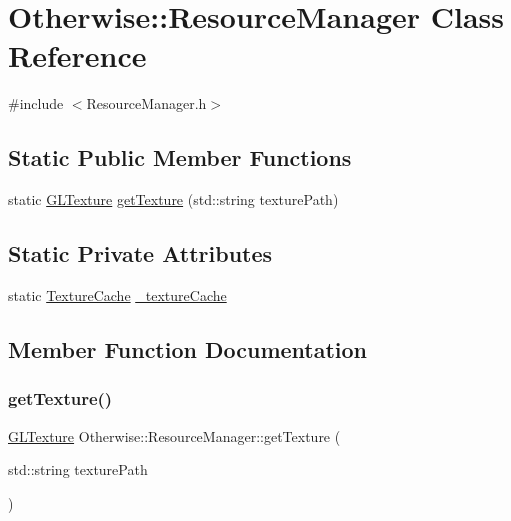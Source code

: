 \hypertarget{class_otherwise_1_1_resource_manager}{}\section{Otherwise\+:\+:Resource\+Manager Class Reference}
\label{class_otherwise_1_1_resource_manager}


{\ttfamily \#include $<$Resource\+Manager.\+h$>$}

\subsection*{Static Public Member Functions}
\begin{DoxyCompactItemize}
\item 
static \hyperlink{struct_otherwise_1_1_g_l_texture}{G\+L\+Texture} \hyperlink{class_otherwise_1_1_resource_manager_a4aaa0b8c06f76643576c5d43338dbe84}{get\+Texture} (std\+::string texture\+Path)
\end{DoxyCompactItemize}
\subsection*{Static Private Attributes}
\begin{DoxyCompactItemize}
\item 
static \hyperlink{class_otherwise_1_1_texture_cache}{Texture\+Cache} \hyperlink{class_otherwise_1_1_resource_manager_a7fb7f4f144620d1e26228662b30530f4}{\+\_\+texture\+Cache}
\end{DoxyCompactItemize}


\subsection{Member Function Documentation}
\mbox{\label{class_otherwise_1_1_resource_manager_a4aaa0b8c06f76643576c5d43338dbe84}} 
\subsubsection{\texorpdfstring{get\+Texture()}{getTexture()}}
{\footnotesize\ttfamily \hyperlink{struct_otherwise_1_1_g_l_texture}{G\+L\+Texture} Otherwise\+::\+Resource\+Manager\+::get\+Texture (\begin{DoxyParamCaption}\item[{std\+::string}]{texture\+Path }\end{DoxyParamCaption})\hspace{0.3cm}{\ttfamily [static]}}



